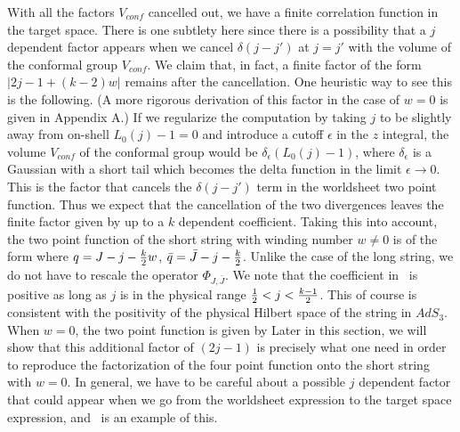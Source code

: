 With all the factors $V_{conf}$ cancelled out, we
have a finite correlation function in the target space.
There is one subtlety here since there is a possibility
that a $j$ dependent factor appears when we cancel
$\delta(j-j')$ at $j=j'$ with the volume of the conformal group
$V_{conf}$.  We claim that, in fact, a finite factor of the
form $|2j -1 + (k-2)w|$ remains after the cancellation.
One heuristic  way to see this is the following.
(A more rigorous derivation
of this factor in the case of $w=0$ is given in Appendix A.)
If we regularize the computation by taking $j$ to
be slightly away from on-shell $L_0(j) - 1 =0$ and
introduce a cutoff $\epsilon$ in the $z$ integral,
the volume $V_{conf}$ of the conformal group would be
$\delta_\epsilon(L_0(j) -1)$, where $\delta_\epsilon$ is
a Gaussian with a short tail
which becomes the delta function in the limit
 $\epsilon \rightarrow 0$.
This is the factor that cancels the $\delta(j-j')$ term
in the worldsheet two point function.
Thus we expect that the cancellation of the two divergences
leaves the finite factor given by
\eqn{}
up to a $k$ dependent coefficient.
Taking this into account, the two point function of the short
string with winding number $w\neq 0$ is   of the form
\eqn{}
where $q=J-j-{k \over 2} w$, $\bar q = \bar J - j - {k \over 2}$.
Unlike
the case of the long string, we do not have to rescale the
operator $\Phi_{J,\bar J}$.
We note that the coefficient in \floweddis\ is positive as long as
$j$ is in the physical range ${1 \over 2} < j < {k-1 \over 2} $.
This
of course is consistent with the positivity of the physical
Hilbert space of the string in $AdS_3$.
When $w=0$, the two point function is given by
\eqn{}
Later in this section, we will show that
this additional factor of $(2j-1)$ is
precisely what one need in order to reproduce the
factorization of the four point function onto
the short string with $w=0$.
In general, we have to be careful about
a possible $j$ dependent factor that could appear when
we go from the worldsheet expression to the
target space expression, and \twoptcorr\ is an example
of this.



